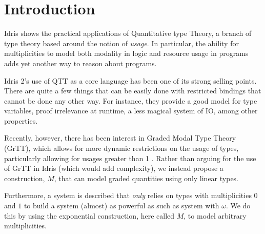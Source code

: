 \section{Introduction}

Idris shows the practical applications of Quantitative type Theory, a branch of type theory based around the notion of \emph{usage}\cite{eb_idris_qtt_prac}.
In particular, the ability for multiplicities to model both modality in logic and resource usage in programs adds yet another way to reason about programs.

Idris 2's use of QTT as a core language has been one of its strong selling points. 
There are quite a few things that can be easily done with restricted bindings that cannot be done any other way.
For instance, they provide a good model for type variables, proof irrelevance at runtime, a less magical system of IO, among other properties.

Recently, however, there has been interest in Graded Modal Type Theory (GrTT), which allows for more dynamic restrictions on the usage of types, particularly allowing for usages greater than 1 \cite{quant_graded_modal}.
Rather than arguing for the use of GrTT in Idris (which would add complexity), we instead propose a construction, $M$, that can model graded quantities using only linear types.

Furthermore, a system is described that \emph{only} relies on types with multiplicities $0$ and $1$ to build a system (almost) as powerful as such as system with $\omega$.
We do this by using the exponential construction, here called $M$, to model arbitrary multiplicities\cite{dep_mult_dep_lin, inverse_of_type}.


